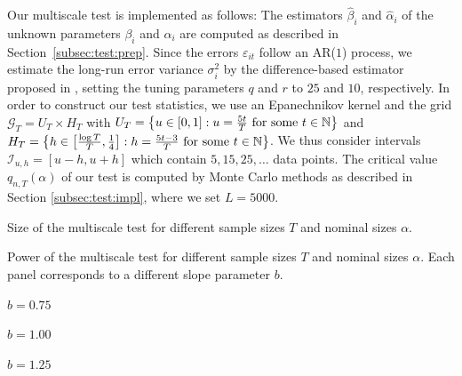 \documentclass[12pt]{article}
\begin{document}
Our multiscale test is implemented as follows: The estimators $\widehat{\beta}_i$ and $\widehat{\alpha}_i$ of the unknown parameters $\beta_i$ and $\alpha_i$ are computed as described in Section~\ref{subsec:test:prep}. Since the errors $\varepsilon_{it}$ follow an AR($1$) process, we estimate the long-run error variance $\sigma_i^2$ by the difference-based estimator proposed in \cite{KhismatullinaVogt2020}, setting the tuning parameters $q$ and $r$ to $25$ and $10$, respectively. In order to construct our test statistics, we use an Epanechnikov kernel and the grid $\mathcal{G}_T = U_T \times H_T$ with 
$U_T  = \big\{ u \in [0,1]: u = \textstyle{\frac{5t}{T}} \text{ for some } t \in \mathbb{N} \big\}$
and
$H_T = \big\{ h \in \big[ \textstyle{\frac{\log T}{T}}, \textstyle{\frac{1}{4}} \big]:  h = \textstyle{\frac{5 t -3}{T}} \text{ for some } t \in \mathbb{N} \big\}$. 
We thus consider intervals $\mathcal{I}_{u, h} = [u-h, u+h]$ which contain $5, 15, 25, \ldots$ data points. The critical value $q_{n,T}(\alpha)$ of our test is computed by Monte Carlo methods as described in Section \ref{subsec:test:impl}, where we set $L=5000$. 


\begin{table}[t]
\footnotesize{
\begin{center}
\caption{Size of the multiscale test for different sample sizes $T$ and nominal sizes $\alpha$.}
\label{tab:size}
\renewcommand{\arraystretch}{1.2}

\end{center}}
\footnotesize{
\begin{center}
\caption{Power of the multiscale test for different sample sizes $T$ and nominal sizes $\alpha$. Each panel corresponds to a different slope parameter $b$.}\label{tab:power}
\begin{subtable}[b]{0.32\textwidth}
\centering
\caption{$b = 0.75$}\label{tab:power_075}
\renewcommand{\arraystretch}{1.2}

\end{subtable}
\begin{subtable}[b]{0.32\textwidth}
\centering
\caption{$b = 1.00$}\label{tab:power_100}
\renewcommand{\arraystretch}{1.2}

\end{subtable}
\begin{subtable}[b]{0.32\textwidth}
\centering
\caption{$b = 1.25$}\label{tab:power_125}
\renewcommand{\arraystretch}{1.2}

\end{subtable}
\end{center}}
\vspace{-0.4cm}
\end{table}
\end{document}
